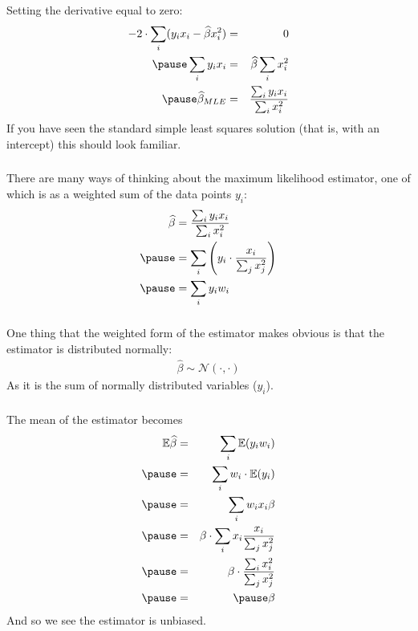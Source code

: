 \begin{frame}[fragile] \frametitle{}

Setting the derivative equal to zero:
\begin{eqnarray*}
-2 \cdot \sum_i ( y_i x_i - \widehat{\beta} x_i^2) &=& 0 \\ \pause
\sum_i y_i x_i &=& \widehat{\beta} \sum_i x_i^2 \\ \pause
\widehat{\beta}_{MLE} &=& \frac{\sum_i y_i x_i}{\sum_i x_i^2}
\end{eqnarray*}
\pause If you have seen the standard simple least squares solution
(that is, with an intercept) this should look familiar.

\end{frame}


\begin{frame}[fragile] \frametitle{}

There are many ways of thinking about the maximum likelihood estimator,
one of which is as a weighted sum of the data points $y_i$:
\begin{align*}
\widehat{\beta} &= \frac{\sum_i y_i x_i}{\sum_i x_i^2} \\ \pause
&= \sum_i \left( y_i \cdot \frac{x_i}{\sum_j x_j^2} \right) \\ \pause
&= \sum_i y_i w_i
\end{align*}

\end{frame}

\begin{frame}[fragile] \frametitle{}

One thing that the weighted form of the estimator makes
obvious is that the estimator is distributed normally:
\begin{align*}
\widehat{\beta} \sim \mathcal{N} (\cdot, \cdot)
\end{align*}
As it is the sum of normally distributed variables ($y_i$).

\end{frame}

\begin{frame}[fragile] \frametitle{}

The mean of the estimator becomes
\begin{eqnarray*}
\mathbb{E} \widehat{\beta} &=& \sum_i \mathbb{E} (y_i w_i) \\ \pause
&=& \sum_i w_i \cdot \mathbb{E} (y_i) \\ \pause
&=& \sum_i w_i x_i \beta \\ \pause
&=& \beta \cdot \sum_i x_i \frac{x_i}{\sum_j x_j^2} \\ \pause
&=& \beta \cdot \frac{\sum_i x_i^2}{\sum_j x_j^2} \\ \pause
&=& \pause \beta
\end{eqnarray*}
And so we see the estimator is unbiased.

\end{frame}

